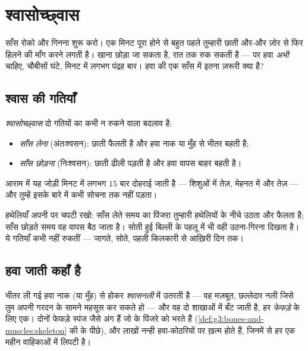 \chapter{श्वासोच्छ्वास}\label{ch:g4:breathing}

साँस रोको और गिनना शुरू करो। एक मिनट पूरा होने से बहुत पहले तुम्हारी
छाती और-और ज़ोर से फिर हिलने की माँग करने लगती है। खाना छोड़ा जा सकता
है,  रात तक रुक सकती है --- पर हवा \emph{अभी} चाहिए, चौबीसों घंटे,
मिनट में लगभग पंद्रह बार। हवा की एक साँस में इतना ज़रूरी क्या है?

\section{श्वास की गतियाँ}

\begin{definition}[साँस लेना और छोड़ना]\label{def:g4:breathing:movements}
\emph{श्वासोच्छ्वास} दो गतियों का कभी न रुकने
वाला बदलाव है:
\begin{itemize}
  \item \emph{साँस लेना} (अंतःश्वसन): छाती फैलती है
        और हवा नाक या मुँह से भीतर बहती है;
  \item \emph{साँस छोड़ना} (निःश्वसन): छाती ढीली पड़ती
        है और हवा वापस बाहर बहती है।
\end{itemize}
आराम में यह जोड़ी मिनट में लगभग $15$ बार दोहराई जाती है --- शिशुओं में
तेज़, मेहनत में और तेज़ --- और तुम्हें इसके बारे में कभी सोचना तक नहीं
पड़ता।
\end{definition}

\begin{example}[गतियों को देखना]\label{ex:g4:breathing:watch}
हथेलियाँ अपनी  पर चपटी रखो: साँस लेते समय  का पिंजरा
तुम्हारी हथेलियों के नीचे उठता और फैलता है; साँस छोड़ते समय वह वापस बैठ
जाता है। सोती हुई बिल्ली के पहलू में भी वही उठना-गिरना दिखता है। ये
गतियाँ कभी नहीं रुकतीं --- जागते, सोते, पहली किलकारी से आख़िरी दिन तक।
\end{example}

\section{हवा जाती कहाँ है}

\begin{definition}[श्वास के अंग]\label{def:g4:breathing:organs}
भीतर ली गई हवा नाक (या मुँह) से होकर \emph{श्वासनली}
में उतरती है --- वह मज़बूत, छल्लेदार नली जिसे तुम अपनी गरदन के सामने
महसूस कर सकते हो --- और वह दो शाखाओं में बँट जाती है, हर
\emph{फेफड़े} के लिए एक। दोनों फेफड़े स्पंज जैसे अंग हैं
जो  के पिंजरे को भरते हैं (\cref{def:g3:bones-and-muscles:skeleton}
की  के पीछे), और लाखों नन्ही हवा-कोठरियों पर ख़त्म होते हैं,
जिनमें से हर एक महीन  वाहिकाओं में लिपटी है।
\end{definition}

